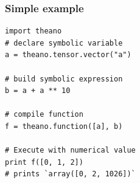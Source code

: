 \documentclass[utf8x,xcolor=pdftex,dvipsnames,table]{beamer}
\begin{document}





\begin{frame}[fragile]
  \frametitle{Simple example}

\begin{lstlisting}
import theano
# declare symbolic variable
a = theano.tensor.vector("a")

# build symbolic expression
b = a + a ** 10

# compile function
f = theano.function([a], b)

# Execute with numerical value
print f([0, 1, 2])
# prints `array([0, 2, 1026])`
\end{lstlisting}
\end{frame}
\end{document}
